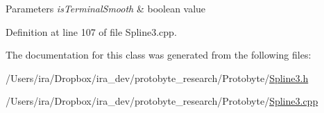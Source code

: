 \begin{DoxyParams}{Parameters}
{\em is\-Terminal\-Smooth} & boolean value \\
\hline
\end{DoxyParams}


Definition at line 107 of file Spline3.\-cpp.



The documentation for this class was generated from the following files\-:\begin{DoxyCompactItemize}
\item 
/\-Users/ira/\-Dropbox/ira\-\_\-dev/protobyte\-\_\-research/\-Protobyte/\hyperlink{_spline3_8h}{Spline3.\-h}\item 
/\-Users/ira/\-Dropbox/ira\-\_\-dev/protobyte\-\_\-research/\-Protobyte/\hyperlink{_spline3_8cpp}{Spline3.\-cpp}\end{DoxyCompactItemize}
